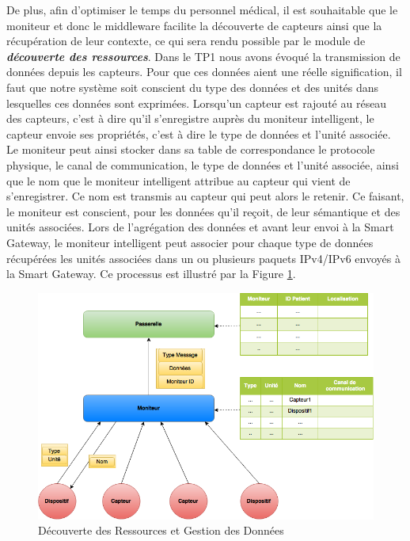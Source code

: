 De plus, afin d'optimiser le temps du personnel médical, il est souhaitable que le moniteur et donc le middleware facilite la découverte de capteurs ainsi que la récupération de leur contexte, ce qui sera rendu possible par le module de \textbf{\textit{découverte des ressources}}. Dans le TP1 nous avons évoqué la transmission de données depuis les capteurs. Pour que ces données aient une réelle signification, il faut que notre système soit conscient du type des données et des unités dans lesquelles ces données sont exprimées. Lorsqu’un capteur est rajouté au réseau des capteurs, c’est à dire qu’il s’enregistre auprès du moniteur intelligent, le capteur envoie ses propriétés, c’est à dire le type de données et l’unité associée. Le moniteur peut ainsi stocker dans sa table de correspondance le protocole physique, le canal de communication, le type de données et l’unité associée, ainsi que le nom que le moniteur intelligent attribue au capteur qui vient de s’enregistrer. Ce nom est transmis au capteur qui peut alors le retenir. Ce faisant, le moniteur est conscient, pour les données qu’il reçoit, de leur sémantique et des unités associées. Lors de l’agrégation des données et avant leur envoi à la Smart Gateway, le moniteur intelligent peut associer pour chaque type de données récupérées les unités associées dans un ou plusieurs paquets IPv4/IPv6 envoyés à la Smart Gateway. Ce processus est illustré par la Figure \ref{5}.
\newline
\begin{figure}[h!]
	\hspace*{-3cm}
	\centering
	\includegraphics[width=1.5\textwidth]{Figure5.png}
	\caption{Découverte des Ressources et Gestion des Données}
	\label{5}
\end{figure}

